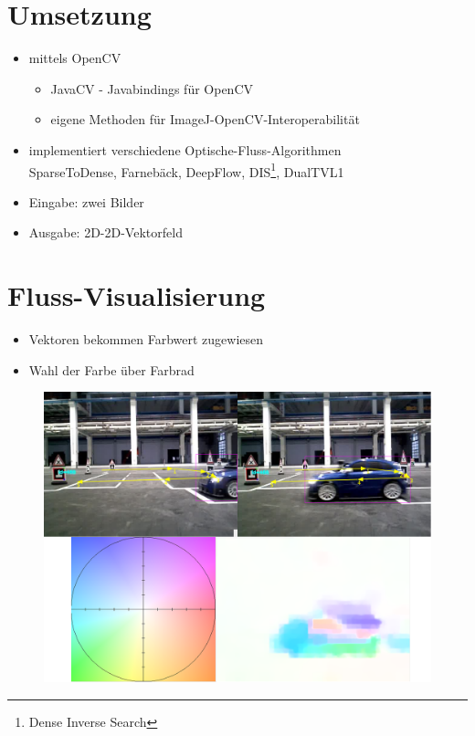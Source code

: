 \documentclass[10pt]{beamer}
\begin{document}
\section{Umsetzung}
\begin{frame}{\secname}
	
	\begin{itemize}
	
		\item mittels OpenCV
		\begin{itemize}
			\item JavaCV - Javabindings für OpenCV
			\item eigene Methoden für ImageJ-OpenCV-Interoperabilität
		\end{itemize}
		\item implementiert verschiedene Optische-Fluss-Algorithmen
			\\ SparseToDense, Farnebäck, DeepFlow, DIS\footnote{Dense Inverse Search}, DualTVL1
		\item Eingabe: zwei Bilder
		\item Ausgabe: 2D-2D-Vektorfeld
		
	\end{itemize}		
	
\end{frame}

\section{Fluss-Visualisierung}
\begin{frame}{\secname}

	\begin{itemize}
		\item Vektoren bekommen Farbwert zugewiesen
		\item Wahl der Farbe über Farbrad
	\end{itemize}

		
	\begin{figure}[h]
	\centering
	\includegraphics[scale=0.2]{./Abbildungen/7.png}
	\label{img:bsp4}
	\end{figure}

\end{frame}
\end{document}
